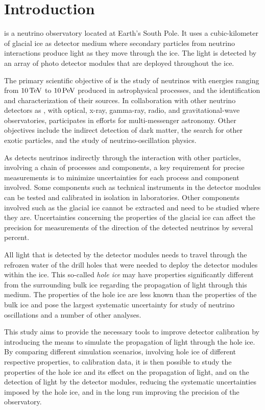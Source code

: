 \section{Introduction}
\label{sec:intro}

\icecube is a neutrino observatory located at Earth's South Pole. It
uses a cubic-kilometer of glacial ice as detector medium where secondary
particles from neutrino interactions produce light as they move through
the ice. The light is detected by an array of photo detector modules
that are deployed throughout the ice. \cite{evidence2013}

The primary scientific objective of \icecube is the study of neutrinos
with energies ranging from \(10\text{\,TeV}\) to \(10\text{\,PeV}\) produced in
astrophysical processes, and the identification and characterization of
their sources. In collaboration with other neutrino detectors as
, with optical, x-ray, gamma-ray, radio, and
gravitational-wave observatories, \icecube participates in efforts for
multi-messenger astronomy. Other objectives include the indirect
detection of dark matter, the search for other exotic particles, and the
study of neutrino-oscillation physics.
\cite{instrumentation, evidence2013}

As \icecube detects neutrinos indirectly through the interaction with
other particles, involving a chain of processes and components, a key
requirement for precise measurements is to minimize uncertainties for
each process and component involved. Some components such as technical
instruments in the detector modules can be tested and calibrated in
isolation in laboratories. Other components involved such as the glacial
ice cannot be extracted and need to be studied where they are.
Uncertainties concerning the properties of the glacial ice can affect
the precision for measurements of the direction of the detected
neutrinos by several percent. \cite{wrede}

All light that is detected by the detector modules needs to travel
through the refrozen water of the drill holes that were needed to deploy
the detector modules within the ice. This so-called \textit{hole ice}
may have properties significantly different from the surrounding bulk
ice regarding the propagation of light through this medium. The
properties of the hole ice are less known than the properties of the
bulk ice and pose the largest systematic uncertainty for study of
neutrino oscillations and a number of other analyses. \cite{icrc17pocam}

This study aims to provide the necessary tools to improve detector
calibration by introducing the means to simulate the propagation of
light through the hole ice. By comparing different simulation scenarios,
involving hole ice of different respective properties, to calibration
data, it is then possible to study the properties of the hole ice and
its effect on the propagation of light, and on the detection of light by
the detector modules, reducing the systematic uncertainties imposed by
the hole ice, and in the long run improving the precision of the
\icecube observatory.


